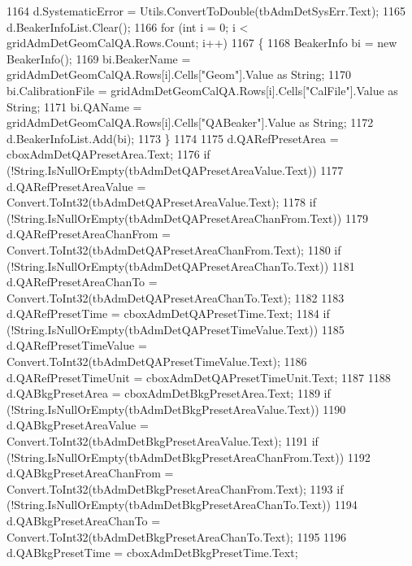 \begin{DoxyCode}
1164                 d.SystematicError = Utils.ConvertToDouble(tbAdmDetSysErr.Text);
1165                 d.BeakerInfoList.Clear();
1166                 \textcolor{keywordflow}{for} (\textcolor{keywordtype}{int} i = 0; i < gridAdmDetGeomCalQA.Rows.Count; i++)
1167                 \{
1168                     BeakerInfo bi = \textcolor{keyword}{new} BeakerInfo();
1169                     bi.BeakerName = gridAdmDetGeomCalQA.Rows[i].Cells[\textcolor{stringliteral}{"Geom"}].Value as String;
1170                     bi.CalibrationFile = gridAdmDetGeomCalQA.Rows[i].Cells[\textcolor{stringliteral}{"CalFile"}].Value as String;
1171                     bi.QAName = gridAdmDetGeomCalQA.Rows[i].Cells[\textcolor{stringliteral}{"QABeaker"}].Value as String;
1172                     d.BeakerInfoList.Add(bi);
1173                 \}
1174 
1175                 d.QARefPresetArea = cboxAdmDetQAPresetArea.Text;
1176                 \textcolor{keywordflow}{if} (!String.IsNullOrEmpty(tbAdmDetQAPresetAreaValue.Text))
1177                     d.QARefPresetAreaValue = Convert.ToInt32(tbAdmDetQAPresetAreaValue.Text);
1178                 \textcolor{keywordflow}{if} (!String.IsNullOrEmpty(tbAdmDetQAPresetAreaChanFrom.Text))
1179                     d.QARefPresetAreaChanFrom = Convert.ToInt32(tbAdmDetQAPresetAreaChanFrom.Text);
1180                 \textcolor{keywordflow}{if} (!String.IsNullOrEmpty(tbAdmDetQAPresetAreaChanTo.Text))
1181                     d.QARefPresetAreaChanTo = Convert.ToInt32(tbAdmDetQAPresetAreaChanTo.Text);
1182 
1183                 d.QARefPresetTime = cboxAdmDetQAPresetTime.Text;
1184                 \textcolor{keywordflow}{if} (!String.IsNullOrEmpty(tbAdmDetQAPresetTimeValue.Text))
1185                     d.QARefPresetTimeValue = Convert.ToInt32(tbAdmDetQAPresetTimeValue.Text);
1186                 d.QARefPresetTimeUnit = cboxAdmDetQAPresetTimeUnit.Text;
1187 
1188                 d.QABkgPresetArea = cboxAdmDetBkgPresetArea.Text;
1189                 \textcolor{keywordflow}{if} (!String.IsNullOrEmpty(tbAdmDetBkgPresetAreaValue.Text))
1190                     d.QABkgPresetAreaValue = Convert.ToInt32(tbAdmDetBkgPresetAreaValue.Text);
1191                 \textcolor{keywordflow}{if} (!String.IsNullOrEmpty(tbAdmDetBkgPresetAreaChanFrom.Text))
1192                     d.QABkgPresetAreaChanFrom = Convert.ToInt32(tbAdmDetBkgPresetAreaChanFrom.Text);
1193                 \textcolor{keywordflow}{if} (!String.IsNullOrEmpty(tbAdmDetBkgPresetAreaChanTo.Text))
1194                     d.QABkgPresetAreaChanTo = Convert.ToInt32(tbAdmDetBkgPresetAreaChanTo.Text);
1195 
1196                 d.QABkgPresetTime = cboxAdmDetBkgPresetTime.Text;

\end{DoxyCode}
